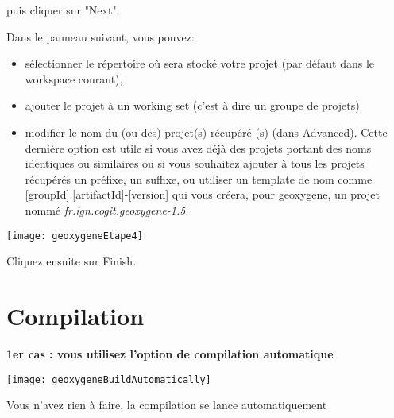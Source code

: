 \bigskip

\noindent
puis cliquer sur "Next".

\bigskip

\noindent
Dans le panneau suivant, vous pouvez:
\begin{itemize}[label=--, leftmargin=* ,parsep=0cm,itemsep=0cm,topsep=0cm]
\item sélectionner le répertoire où sera stocké votre projet (par défaut dans le workspace courant), 
\item ajouter le projet à un working set (c'est à dire un groupe de projets)
\item modifier le nom du (ou des) projet(s) récupéré (s) (dans Advanced). Cette dernière option est utile si vous avez déjà des projets portant des noms identiques ou similaires ou si vous souhaitez ajouter à tous les projets récupérés un préfixe, un suffixe, ou utiliser un template de nom comme [groupId].[artifactId]-[version] qui vous créera, pour geoxygene, un projet nommé \emph{fr.ign.cogit.geoxygene-1.5}.
\end{itemize}

\begin{center}
\texttt{[image: geoxygeneEtape4]}
\end{center}

\bigskip

\noindent
Cliquez ensuite sur Finish.


\newpage
\section{Compilation}

\begin{flushleft}
    \bf
    1er cas : vous utilisez l'option de compilation automatique
\end{flushleft}

\begin{center}
\texttt{[image: geoxygeneBuildAutomatically]}
\end{center}

\noindent
Vous n'avez rien à faire, la compilation se lance automatiquement


\smallskip
 
